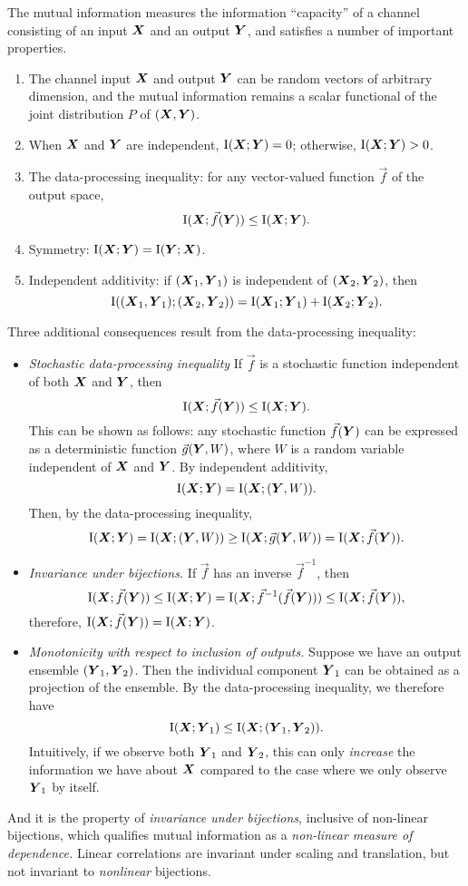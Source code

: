The mutual information measures the information ``capacity'' of a
channel consisting of an input $\boldsymbol{X}$ and an output $\boldsymbol{Y}$, and
satisfies a number of important properties.
\begin{enumerate}
\item The channel input $\boldsymbol{X}$ and output $\boldsymbol{Y}$ can be random vectors of arbitrary dimension, and the mutual information remains a scalar functional of the joint distribution $P$ of $(\boldsymbol{X}, \boldsymbol{Y})$.
\item When $\boldsymbol{X}$ and $\boldsymbol{Y}$ are independent, $\text{I}(\boldsymbol{X}; \boldsymbol{Y}) = 0$; otherwise, $\text{I}(\boldsymbol{X}; \boldsymbol{Y}) > 0$.
\item The data-processing inequality: for any vector-valued function $\vec{f}$ of the output space,
\[
\text{I}(\boldsymbol{X}; \vec{f}(\boldsymbol{Y})) \leq \text{I}(\boldsymbol{X}; \boldsymbol{Y}).
\]
\item Symmetry: $\text{I}(\boldsymbol{X}; \boldsymbol{Y}) = \text{I}(\boldsymbol{Y}; \boldsymbol{X})$.
\item Independent additivity: if $(\boldsymbol{X}_1,\boldsymbol{Y}_1)$ is independent of $(\boldsymbol{X}_2, \boldsymbol{Y}_2)$, then
\[
\text{I}((\boldsymbol{X}_1,\boldsymbol{Y}_1); (\boldsymbol{X}_2, \boldsymbol{Y}_2)) = \text{I}(\boldsymbol{X}_1; \boldsymbol{Y}_1) + \text{I}(\boldsymbol{X}_2; \boldsymbol{Y}_2).
\]
\end{enumerate}
Three additional consequences result from the data-processing inequality:
\begin{itemize}
\item \emph{Stochastic data-processing inequality}  If $\vec{f}$ is a stochastic function independent of both $\boldsymbol{X}$ and $\boldsymbol{Y}$, then
\[
\text{I}(\boldsymbol{X}; \vec{f}(\boldsymbol{Y})) \leq \text{I}(\boldsymbol{X}; \boldsymbol{Y}).
\]
This can be shown as follows: any stochastic function $\vec{f}(\boldsymbol{Y})$
can be expressed as a deterministic function $\vec{g}(\boldsymbol{Y}, W)$, where
$W$ is a random variable independent of $\boldsymbol{X}$ and $\boldsymbol{Y}$.
By independent additivity,
\[
\text{I}(\boldsymbol{X}; \boldsymbol{Y}) = \text{I}(\boldsymbol{X}; (\boldsymbol{Y}, W)).
\]
Then, by the data-processing inequality,
\[
\text{I}(\boldsymbol{X}; \boldsymbol{Y}) = \text{I}(\boldsymbol{X}; (\boldsymbol{Y}, W)) \geq \text{I}(\boldsymbol{X}; \vec{g}(\boldsymbol{Y}, W)) = \text{I}(\boldsymbol{X}; \vec{f}(\boldsymbol{Y})).
\]
\item \emph{Invariance under bijections.} If $\vec{f}$ has an inverse $\vec{f}^{-1}$, then 
\[
\text{I}(\boldsymbol{X}; \vec{f}(\boldsymbol{Y})) \leq \text{I}(\boldsymbol{X}; \boldsymbol{Y}) = \text{I}(\boldsymbol{X}; \vec{f}^{-1}(\vec{f}(\boldsymbol{Y}))) \leq \text{I}(\boldsymbol{X}; \vec{f}(\boldsymbol{Y})),
\]
therefore, $\text{I}(\boldsymbol{X}; \vec{f}(\boldsymbol{Y})) = \text{I}(\boldsymbol{X}; \boldsymbol{Y})$.
\item \emph{Monotonicity with respect to inclusion of outputs.}  Suppose we have an output ensemble $(\boldsymbol{Y}_1,\boldsymbol{Y}_2)$.  Then the individual component $\boldsymbol{Y}_1$ can be obtained as a projection of the ensemble.  By the data-processing inequality, we therefore have
\[
\text{I}(\boldsymbol{X}; \boldsymbol{Y}_1) \leq \text{I}(\boldsymbol{X}; (\boldsymbol{Y}_1, \boldsymbol{Y}_2)).
\]
Intuitively, if we observe both $\boldsymbol{Y}_1$ and $\boldsymbol{Y}_2$, this can
only \emph{increase} the information we have about $\boldsymbol{X}$ compared to
the case where we only observe $\boldsymbol{Y}_1$ by itself.
\end{itemize}
And it is the property of \emph{invariance under bijections},
inclusive of non-linear bijections, which qualifies mutual information
as a \emph{non-linear measure of dependence.}  Linear correlations are
invariant under scaling and translation, but not invariant
to \emph{nonlinear} bijections.

